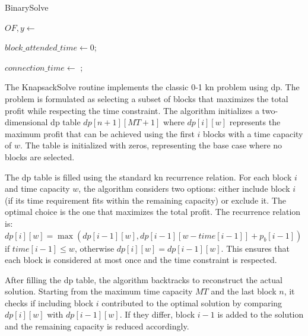 \begin{algorithm}[h!]
	\caption{BinarySolve}
	\SetAlgoLined

	$OF, y \leftarrow$ \;

	$block\_attended\_time \leftarrow 0$; 

	$connection\_time \leftarrow$ ; 

	\;
\end{algorithm}

The KnapsackSolve routine implements the classic 0-1 \gls{kn} problem using \gls{dp}. The problem is formulated as selecting a subset of blocks that maximizes the total profit while respecting the time constraint. The algorithm initializes a two-dimensional \gls{dp} table $dp[n+1][MT+1]$ where $dp[i][w]$ represents the maximum profit that can be achieved using the first $i$ blocks with a time capacity of $w$. The table is initialized with zeros, representing the base case where no blocks are selected.

The \gls{dp} table is filled using the standard \gls{kn} recurrence relation. For each block $i$ and time capacity $w$, the algorithm considers two options: either include block $i$ (if its time requirement fits within the remaining capacity) or exclude it. The optimal choice is the one that maximizes the total profit. The recurrence relation is: $dp[i][w] = \max(dp[i-1][w], dp[i-1][w-time[i-1]] + p_b[i-1])$ if $time[i-1] \leq w$, otherwise $dp[i][w] = dp[i-1][w]$. This ensures that each block is considered at most once and the time constraint is respected.

After filling the \gls{dp} table, the algorithm backtracks to reconstruct the actual solution. Starting from the maximum time capacity $MT$ and the last block $n$, it checks if including block $i$ contributed to the optimal solution by comparing $dp[i][w]$ with $dp[i-1][w]$. If they differ, block $i-1$ is added to the solution and the remaining capacity is reduced accordingly.

